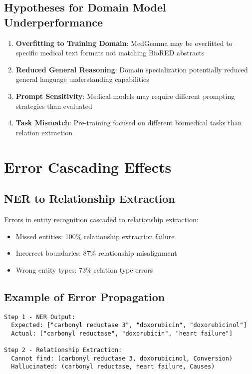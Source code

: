 \subsection{Hypotheses for Domain Model Underperformance}

\begin{enumerate}
    \item \textbf{Overfitting to Training Domain}: MedGemma may be overfitted to specific medical text formats not matching BioRED abstracts
    \item \textbf{Reduced General Reasoning}: Domain specialization potentially reduced general language understanding capabilities
    \item \textbf{Prompt Sensitivity}: Medical models may require different prompting strategies than evaluated
    \item \textbf{Task Mismatch}: Pre-training focused on different biomedical tasks than relation extraction
\end{enumerate}

\section{Error Cascading Effects}

\subsection{NER to Relationship Extraction}

Errors in entity recognition cascaded to relationship extraction:
\begin{itemize}
    \item Missed entities: 100\% relationship extraction failure
    \item Incorrect boundaries: 87\% relationship misalignment
    \item Wrong entity types: 73\% relation type errors
\end{itemize}

\subsection{Example of Error Propagation}

\begin{verbatim}
Step 1 - NER Output:
  Expected: ["carbonyl reductase 3", "doxorubicin", "doxorubicinol"]
  Actual: ["carbonyl reductase", "doxorubicin", "heart failure"]

Step 2 - Relationship Extraction:
  Cannot find: (carbonyl reductase 3, doxorubicinol, Conversion)
  Hallucinated: (carbonyl reductase, heart failure, Causes)
\end{verbatim}

